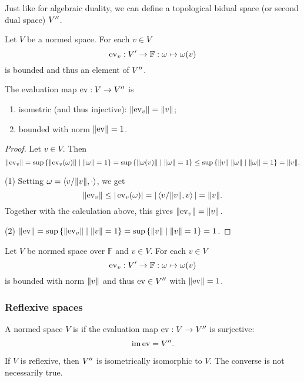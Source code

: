 Just like for algebraic duality, we can define a topological bidual space (or second dual space) ${V}^{\prime\prime}$.

\begin{proposition}
Let $V$ be a normed space. 
For each $v\in V$
\[ \operatorname{ev}_v: {V}^\prime \to \mathbb{F}: \omega \mapsto \omega(v) \]
is bounded and thus an element of ${V}^{\prime\prime}$.

The evaluation map $\operatorname{ev}: V \to {V}^{\prime\prime}$ is
\begin{enumerate}
\item isometric (and thus injective): $\lVert\operatorname{ev}_v\rVert = \lVert v\rVert$;
\item bounded with norm $\lVert\operatorname{ev}\rVert = 1$.
\end{enumerate}
\end{proposition}
\begin{proof}
Let $v\in V$. Then
\[ \lVert\operatorname{ev}_v\rVert = \sup\left\{ \lVert\operatorname{ev}_v(\omega)\rVert \;\middle|\; \lVert\omega\rVert=1 \right\} = \sup\left\{ \lVert\omega(v)\rVert \;\middle|\; \lVert\omega\rVert=1 \right\} \leq \sup\left\{ \lVert v\rVert\;\lVert\omega\rVert \;\middle|\; \lVert\omega\rVert=1 \right\} = \lVert v\rVert. \]

(1) Setting $\omega = \left\langle v/\lVert v\rVert, \cdot \right\rangle$, we get
\[ \lVert\operatorname{ev}_v\rVert \leq |\operatorname{ev}_v(\omega)| = |\left\langle v/\lVert v\rVert, v \right\rangle| = \lVert v\rVert. \]
Together with the calculation above, this gives $\lVert\operatorname{ev}_v\rVert = \lVert v\rVert$.

(2) $\lVert\operatorname{ev}\rVert = \sup\left\{ \lVert\operatorname{ev}_v\rVert \;\middle|\; \lVert v\rVert=1 \right\} = \sup\left\{ \lVert v\rVert \;\middle|\; \lVert v\rVert=1 \right\} = 1$.
\end{proof}

\begin{lemma}
Let $V$ be normed space over $\mathbb{F}$ and $v\in V$. For each $v\in V$
\[ \operatorname{ev}_v: {V}^\prime \to \mathbb{F}: \omega \mapsto \omega(v) \]
is bounded with norm $\lVert v\rVert$ and thus $\operatorname{ev}\in {V}^{\prime\prime}$ with $\lVert\operatorname{ev}\rVert = 1$.
\end{lemma}


\subsubsection{Reflexive spaces}
\begin{definition}
A normed space $V$ is  if the evaluation map $\operatorname{ev}:V\to {V}^{\prime\prime}$ is surjective:
\[ \operatorname{im}\operatorname{ev} = {V}^{\prime\prime}. \]
\end{definition}
If $V$ is reflexive, then ${V}^{\prime\prime}$ is isometrically isomorphic to $V$. The converse is not necessarily true.

